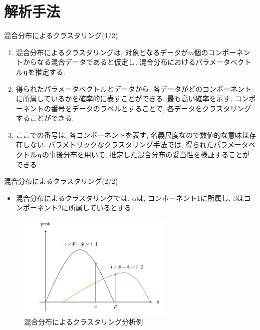 \documentclass[dvipdfmx]{beamer} %
\newcommand{\bm}[1]{\mbox{\boldmath $#1$}}
\begin{document}
\section{解析手法}
\begin{frame}{混合分布によるクラスタリング(1/2)}
\begin{enumerate}
\item
混合分布によるクラスタリングは, 対象となるデータが$m$個のコンポーネントからなる混合データであると仮定し, 混合分布におけるパラメータベクトル$\bm \eta$を推定する. 
\item
得られたパラメータベクトルとデータから, 各データがどのコンポーネントに所属しているかを確率的に表すことができる. 最も高い確率を示す, コンポーネントの番号をデータのラベルとすることで, 各データをクラスタリングすることができる.　
\item
ここでの番号は, 各コンポーネントを表す, 名義尺度なので数値的な意味は存在しない. パラメトリックなクラスタリング手法では, 得られたパラメータベクトル$\bm \eta$の事後分布を用いて, 推定した混合分布の妥当性を検証することができる.	
 
\end{enumerate}

\end{frame}

\begin{frame}{混合分布によるクラスタリング(2/2)}

\begin{itemize}
	\item 混合分布によるクラスタリングでは, $\alpha$は, コンポーネント1に所属し, $\beta$はコンポーネント2に所属しているとする.
\end{itemize}
\begin{figure}[tbp]
\begin{center}
\includegraphics[clip,height= 50mm]{data/mix_cluster.png}
\end{center}
\caption{混合分布によるクラスタリング分析例}
\label{mix_cluster}
\end{figure}


\end{frame}
\end{document}
